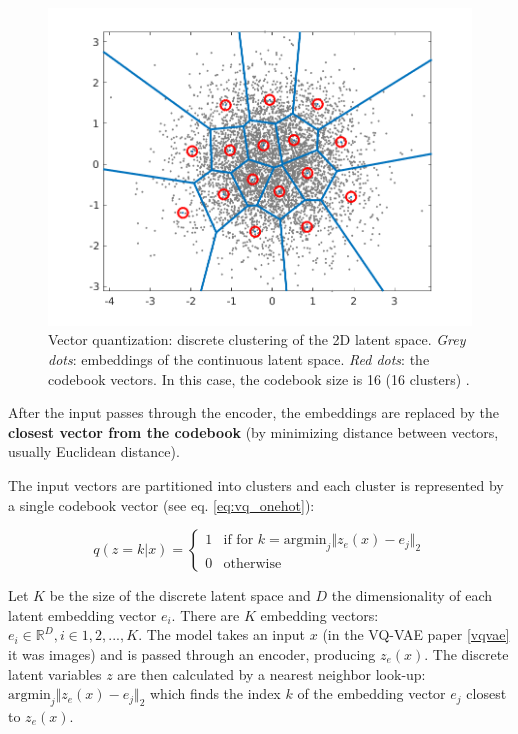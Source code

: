 \begin{figure}[h]
    \centering
    \includegraphics[scale=0.5]{images/vq_visualization.png}
    \caption{Vector quantization: discrete clustering of the 2D latent space. \textit{Grey dots}: embeddings of the continuous latent space. \textit{Red dots}: the codebook vectors. In this case, the codebook size is 16 (16 clusters) \cite{vq_visualization_website}.}
    \label{figure:vq_visualization}
\end{figure}

After the input passes through the encoder, the embeddings are replaced by the \textbf{closest vector from the codebook} (by minimizing distance between vectors, usually Euclidean distance). 

The input vectors are partitioned into clusters and each cluster is represented by a single codebook vector (see eq. \ref{eq:vq_onehot}):

\begin{equation}
    \label{eq:vq_onehot}
    q(z=k|x) = \begin{cases}
        1 & \text{if } \text{for } k=\text{argmin}_j \Vert z_e(x) - e_j \Vert_2 \\
        0 & \text{otherwise}
    \end{cases}
\end{equation}

Let $K$ be the size of the discrete latent space and $D$ the dimensionality of each latent embedding vector $e_i$. There are $K$ embedding vectors: $e_i \in \mathbb{R}^D, i \in 1, 2, ..., K$. The model takes an input $x$ (in the VQ-VAE paper \ref{vqvae} it was images) and is passed through an encoder, producing $z_e(x)$. The discrete latent variables $z$ are then calculated by a nearest neighbor look-up: $\text{argmin}_j \Vert z_e(x) - e_j \Vert_2$ which finds the index $k$ of the embedding vector $e_j$ closest to $z_e(x)$. 


